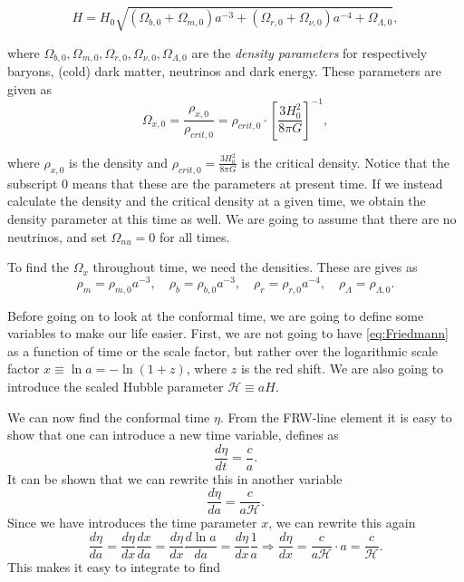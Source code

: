 \documentclass[a4paper,norsk, 10pt]{article}
\begin{document}
\begin{equation}\label{eq:Friedmann}
H = H_0 \sqrt{(\Omega_{b,0} + \Omega_{m,0})a^{-3} + (\Omega_{r,0} + \Omega_{\nu,0})a^{-4} + \Omega_{\Lambda,0}},
\end{equation}

where $\Omega_{b,0}, \Omega_{m,0}, \Omega_{r,0}, \Omega_{\nu,0}, \Omega_{\Lambda,0}$ are the \textit{density parameters} for respectively baryons, (cold) dark matter, neutrinos and dark energy. These parameters are given as
\begin{equation}\label{eq:Omega}
\Omega_{x,0} = \frac{\rho_{x,0}}{\rho_{crit,0}} = \rho_{crit,0}\cdot\left[\frac{3H_0^2}{8\pi G}\right]^{-1},
\end{equation}

where $\rho_{x,0}$ is the density and $\rho_{crit,0} = \frac{3H_0^2}{8\pi G}$ is the critical density. Notice that the subscript $0$ means that these are the parameters at present time. If we instead calculate the density and the critical density at a given time, we obtain the density parameter at this time as well. We are going to assume that there are no neutrinos, and set $\Omega_{nu} = 0$ for all times.

To find the $\Omega_{x}$ throughout time, we need the densities. These are gives as
\begin{equation}\label{eq:rho}
\rho_{m} = \rho_{m,0} a^{-3}, \quad \rho_{b} = \rho_{b,0} a^{-3}, \quad \rho_{r} = \rho_{r,0} a^{-4}, \quad \rho_{\Lambda} = \rho_{\Lambda,0}.
\end{equation}

Before going on to look at the conformal time, we are going to define some variables to make our life easier. First, we are not going to have \eqref{eq:Friedmann} as a function of time or the scale factor, but rather over the logarithmic scale factor $x \equiv \ln a = - \ln(1+z)$, where $z$ is the red shift. We are also going to introduce the scaled Hubble parameter $\mathcal{H} \equiv aH$.

We can now find the conformal time $\eta$. From the FRW-line element it is easy to show that one can introduce a new time variable, defines as
\begin{equation}
\frac{d\eta}{dt} = \frac{c}{a}.
\end{equation}
It can be shown that we can rewrite this in another variable
\begin{equation}
\frac{d \eta}{da} = \frac{c}{a\mathcal{H}}.
\end{equation}
Since we have introduces the time parameter $x$, we can rewrite this again
\begin{equation}\label{eq:deta/dx}
\frac{d\eta}{da} = \frac{d\eta}{dx}\frac{dx}{da} = \frac{d\eta}{dx}\frac{d \ln a}{da} = \frac{d\eta}{dx}\frac{1}{a} \Rightarrow \frac{d\eta}{dx} = \frac{c}{a\mathcal{H}}\cdot a = \frac{c}{\mathcal{H}}.
\end{equation}
This makes it easy to integrate to find 
\end{document}
